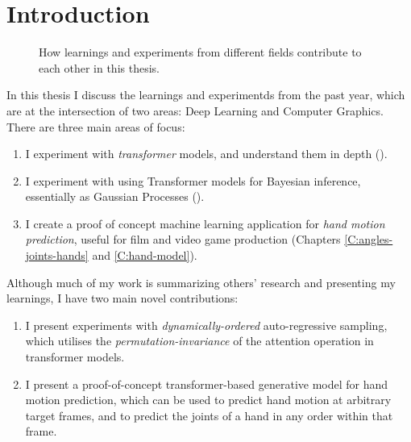 \chapter{Introduction}
\label{C:intro}

\begin{figure}[t]
\centering
{}
\caption[The relationship between the different fields in this thesis]{How learnings and experiments from different fields contribute to each other in this thesis.}
\end{figure}

In this thesis I discuss the learnings and experimentds from the past year, which are at the intersection of two areas: Deep Learning and Computer Graphics. There are three main areas of focus:
\begin{enumerate}
    \item I experiment with \textit{transformer} models, and understand them in depth ().
    \item I experiment with using Transformer models for Bayesian inference, essentially as Gaussian Processes ().
    \item I create a proof of concept machine learning application for \textit{hand motion prediction}, useful for film and video game production (Chapters \ref{C:angles-joints-hands} and \ref{C:hand-model}).
\end{enumerate}

Although much of my work is summarizing others' research and presenting my learnings, I have two main novel contributions:
\begin{enumerate}
    \item I present experiments with \textit{dynamically-ordered} auto-regressive sampling, which utilises the \textit{permutation-invariance} of the attention operation in transformer models.
    \item I present a proof-of-concept transformer-based generative model for hand motion prediction, which can be used to predict hand motion at arbitrary target frames, and to predict the joints of a hand in any order within that frame.
\end{enumerate}

